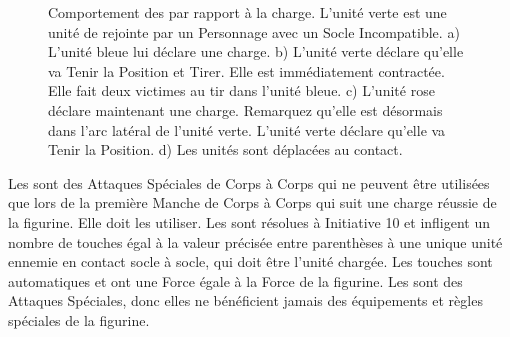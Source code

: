 \begin{figure}[!htbp]
\centering
\hypertarget{skirmishersfigure}{
\def\svgwidth{\textwidth}
}
\caption{Comportement des \skirmishers{} par rapport à la charge.\vspace*{10pt}\newline
L'unité verte est une unité de \skirmishers{} rejointe par un Personnage avec un Socle Incompatible.\vspace*{10pt}\newline
a) L'unité bleue lui déclare une charge.\newline
b) L'unité verte déclare qu'elle va Tenir la Position et Tirer. Elle est immédiatement contractée. Elle fait deux victimes au tir dans l'unité bleue.\newline
c) L'unité rose déclare maintenant une charge. Remarquez qu'elle est désormais dans l'arc latéral de l'unité verte. L'unité verte déclare qu'elle va Tenir la Position.\newline
d) Les unités sont déplacées au contact.}
\label{figure/skirmishers}
\end{figure}


Les \impacthits{} sont des Attaques Spéciales de Corps à Corps qui ne peuvent être utilisées que lors de la première Manche de Corps à Corps qui suit une charge réussie de la figurine. Elle doit les utiliser. Les \impacthits{} sont résolues à Initiative 10 et infligent un nombre de touches égal à la valeur précisée entre parenthèses à une unique unité ennemie en contact socle à socle, qui doit être l'unité chargée. Les touches sont automatiques et ont une Force égale à la Force de la figurine.  Les \impacthits{} sont des Attaques Spéciales, donc elles ne bénéficient jamais des équipements et règles spéciales de la figurine. 


